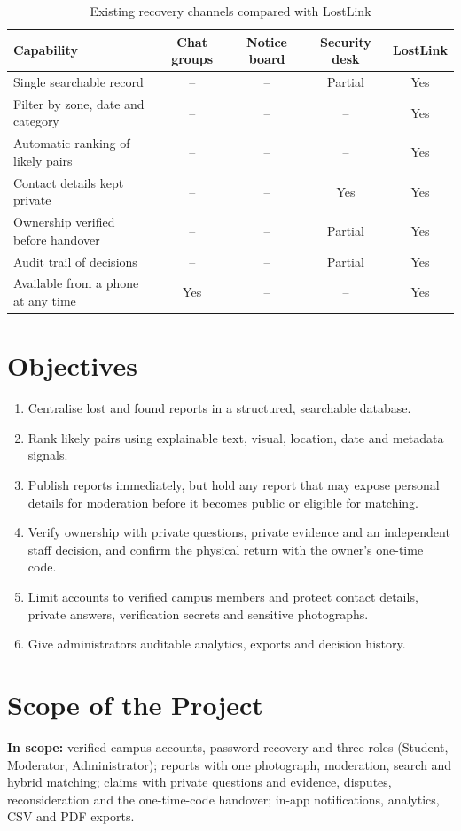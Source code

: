 \documentclass[12pt,a4paper,oneside]{report}
\begin{document}
\begin{table}[H]
\centering\small
\caption[Existing channels compared with LostLink]{Existing recovery channels compared with LostLink}
\begin{tabularx}{\textwidth}{X cccc}
\toprule
Capability & Chat groups & Notice board & Security desk & LostLink\\
\midrule
Single searchable record & -- & -- & Partial & Yes\\
Filter by zone, date and category & -- & -- & -- & Yes\\
Automatic ranking of likely pairs & -- & -- & -- & Yes\\
Contact details kept private & -- & -- & Yes & Yes\\
Ownership verified before handover & -- & -- & Partial & Yes\\
Audit trail of decisions & -- & -- & Partial & Yes\\
Available from a phone at any time & Yes & -- & -- & Yes\\
\bottomrule
\end{tabularx}
\end{table}

\section{Objectives}
\begin{enumerate}
  \item Centralise lost and found reports in a structured, searchable database.
  \item Rank likely pairs using explainable text, visual, location, date and metadata signals.
  \item Publish reports immediately, but hold any report that may expose personal details for moderation before it becomes public or eligible for matching.
  \item Verify ownership with private questions, private evidence and an independent staff decision, and confirm the physical return with the owner's one-time code.
  \item Limit accounts to verified campus members and protect contact details, private answers, verification secrets and sensitive photographs.
  \item Give administrators auditable analytics, exports and decision history.
\end{enumerate}

\section{Scope of the Project}
\textbf{In scope:} verified campus accounts, password recovery and three roles (Student, Moderator, Administrator); reports with one photograph, moderation, search and hybrid matching; claims with private questions and evidence, disputes, reconsideration and the one-time-code handover; in-app notifications, analytics, CSV and PDF exports.
\end{document}
